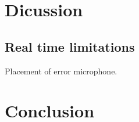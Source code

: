 \section{Dicussion}
\subsection*{Real time limitations}
Placement of error microphone.


\section{Conclusion}
